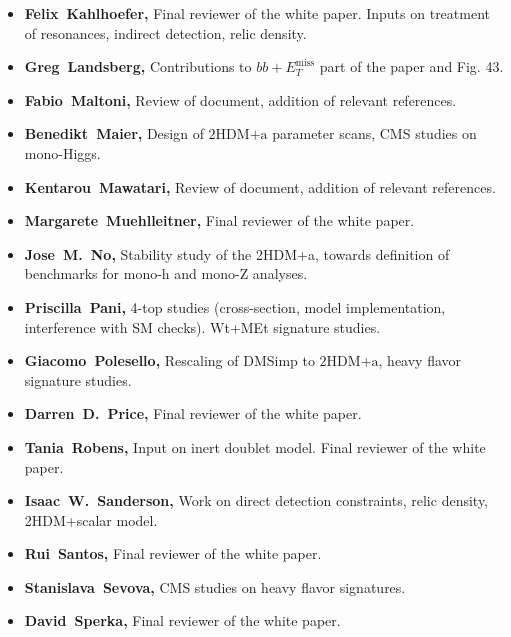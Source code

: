 \documentclass[a4paper, 11pt,notoc]{article}
\newcommand{\MET}{\ensuremath{E_T^\mathrm{miss}}\xspace}
\newcommand{\hdma}{\ensuremath{\textrm{2HDM+a}}\xspace}
\begin{document}
\begin{itemize}
\item \textbf{Felix~Kahlhoefer,} Final reviewer of the white paper. Inputs on treatment of resonances, indirect detection, relic density. 

\item \textbf{Greg~Landsberg,} Contributions to $bb+\MET$ part of the paper and Fig. 43.

\item \textbf{Fabio~Maltoni,} Review of document, addition of relevant references.

\item \textbf{Benedikt~Maier,} Design of \hdma parameter scans, CMS studies on mono-Higgs.

\item \textbf{Kentarou~Mawatari,} Review of document, addition of relevant references.

\item \textbf{Margarete~Muehlleitner,} Final reviewer of the white paper. 

\item \textbf{Jose~M.~No,} Stability study of the 2HDM+a, towards definition of benchmarks for mono-h and mono-Z analyses.

\item \textbf{Priscilla~Pani,} 4-top studies (cross-section, model implementation, interference with SM checks). Wt+MEt signature studies. 

\item \textbf{Giacomo~Polesello,} Rescaling of DMSimp to \hdma, heavy flavor signature studies. 

\item \textbf{Darren~D.~Price,}  Final reviewer of the white paper. 

\item \textbf{Tania~Robens,} Input on inert doublet model. Final reviewer of the white paper. 

\item \textbf{Isaac~W.~Sanderson,}  Work on direct detection constraints, relic density, 2HDM+scalar model.

\item \textbf{Rui~Santos,}  Final reviewer of the white paper. 

\item \textbf{Stanislava~Sevova,} CMS studies on heavy flavor signatures. 

\item \textbf{David~Sperka,}  Final reviewer of the white paper. 


\end{itemize}
\end{document}
